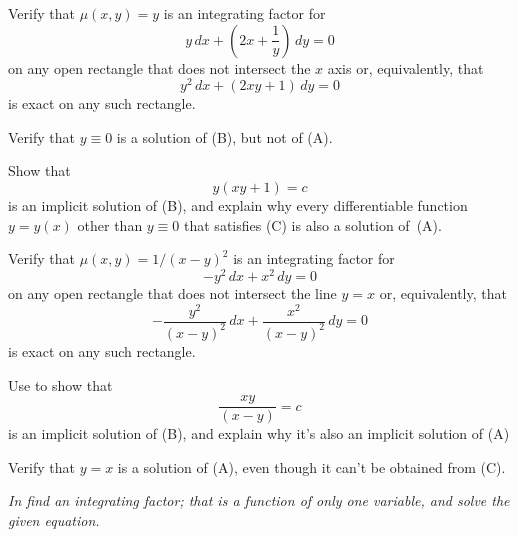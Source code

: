  \exercises
\begin{exerciselist}

\item\label{exer:2.6.1}\begin{alist}
\item %
Verify that $\mu(x,y)=y$ is an integrating factor for
\[
y\,dx+\left(2x+\frac{1}{y}\right)\,dy=0\tag{A}
\]
on any open rectangle that does not intersect  the $x$ axis
or, equivalently,  that
\[
y^2\,dx+(2xy+1)\,dy=0\tag{B}
\]
is exact on any such rectangle.
\item %
Verify that $y\equiv0$  is a solution of  (B),
but not of  (A).
\item %
Show that
\[
y(xy+1)=c\tag{C}
\]
is an implicit solution of (B), and explain why
every differentiable function $y=y(x)$ other than $y\equiv0$
that satisfies  (C)
 is also a solution of~(A).
\end{alist}

\item\label{exer:2.6.2}\begin{alist}
\item %
Verify that $\mu(x,y)=1/(x-y)^2$ is an integrating factor for
\[
-y^2\,dx+x^2\,dy=0\tag{A}
\]
on any open rectangle  that does not intersect the line $y=x$
or, equivalently, that
\[
-\frac{y^2}{(x-y)^2}\,dx+\frac{x^2}{(x-y)^2}\,dy=0\tag{B}
\]
is exact on any such rectangle.
\item %
Use  to show that
\[
\frac{xy}{(x-y)}=c\tag{C}
\]
is an implicit solution of (B), and explain why
it's also an implicit solution of (A)
\item %
Verify that $y=x$  is a solution of  (A),
even though it can't be obtained from  (C).
\end{alist}
\end{exerciselist}
%
\textsl{In  find an
integrating factor;
that is a function of only one variable, and solve the given equation.}

